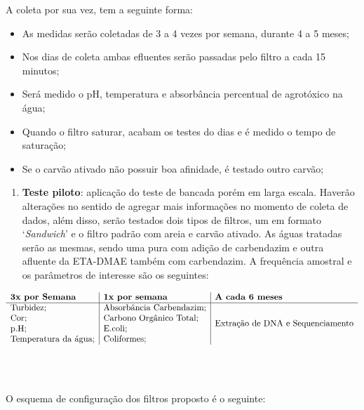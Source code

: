 \documentclass[
]{article}
\providecommand{\tightlist}{%
  \setlength{\itemsep}{0pt}\setlength{\parskip}{0pt}}
\begin{document}
A coleta por sua vez, tem a seguinte forma:

\begin{itemize}
\tightlist
\item
  As medidas serão coletadas de 3 a 4 vezes por semana, durante 4 a 5
  meses;
\item
  Nos dias de coleta ambas efluentes serão passadas pelo filtro a cada
  15 minutos;
\item
  Será medido o pH, temperatura e absorbância percentual de agrotóxico
  na água;
\item
  Quando o filtro saturar, acabam os testes do dias e é medido o tempo
  de saturação;
\item
  Se o carvão ativado não possuir boa afinidade, é testado outro carvão;
\end{itemize}

\begin{enumerate}
\def\labelenumi{\alph{enumi})}
\setcounter{enumi}{1}
\tightlist
\item
  \textbf{Teste piloto}: aplicação do teste de bancada porém em larga
  escala. Haverão alterações no sentido de agregar mais informações no
  momento de coleta de dados, além disso, serão testados dois tipos de
  filtros, um em formato `\emph{Sandwich}' e o filtro padrão com areia e
  carvão ativado. As águas tratadas serão as mesmas, sendo uma pura com
  adição de carbendazim e outra afluente da ETA-DMAE também com
  carbendazim. A frequência amostral e os parâmetros de interesse são os
  seguintes:
\end{enumerate}

\[
\begin{array}{l|l|l}
\textbf{3x por Semana}  & \textbf{1x por semana} & \textbf{A cada 6 meses}   \\ \hline
\begin{array}[c]{@{}l@{}}\text{Turbidez};\\ \text{Cor};\\ \text{p.H};\\ \text{Temperatura da água};\\\end{array} & \begin{array}[c]{@{}l@{}}\text{Absorbância Carbendazim};\\ \text{Carbono Orgânico Total};\\ \text{E.coli};\\ \text{Coliformes};\end{array} & \text{Extração de DNA e Sequenciamento}
\end{array}
\]\\
~\\
~\\
O esquema de configuração dos filtros proposto é o seguinte:
\end{document}
